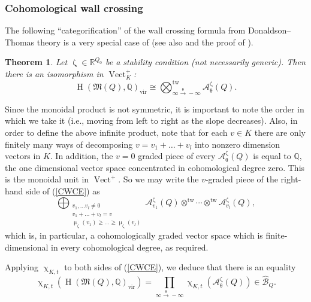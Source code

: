 \documentclass{amsart}
\DeclareMathOperator{\Vect}{Vect}
\DeclareMathOperator{\tw}{tw}
\newcommand{\Mst}{\mathfrak{M}}
\DeclareMathOperator{\HO}{H}
\DeclareMathOperator{\vir}{vir}
\renewcommand{\theta}{\uptheta}
\renewcommand{\zeta}{\upzeta}
\renewcommand{\chi}{\upchi}
\renewcommand{\mu}{\upmu}
\theoremstyle{plain}%
\newtheorem{thm}{Theorem}[section]
\theoremstyle{definition}
\theoremstyle{remark}
\begin{document}
\subsubsection{Cohomological wall crossing}
The following ``categorification'' of the wall crossing formula from Donaldson--Thomas theory is a very special case of \cite[Thm B]{DavMei} (see also \cite{FraRei} and the proof of \cite[Thm 3.21]{DavPos}).
\begin{thm}\label{coh_WCF_thm}
Let $\zeta\in\mathbb{R}^{Q_0}$ be a stability condition (not necessarily generic).  Then there is an isomorphism in $\Vect^+_{K}$:
\begin{equation}
\label{CWCE}
\HO(\Mst(Q),\mathbb{Q})_{\vir}\cong \bigotimes^{\tw}_{\infty \xrightarrow{\theta}-\infty}\mathcal{A}_{\theta}^{\zeta}(Q).
\end{equation}
\end{thm}
Since the monoidal product is not symmetric, it is important to note the order in which we take it (i.e., moving from left to right as the slope decreases).  Also, in order to define the above infinite product, note that for each $v\in K$ there are only finitely many ways of decomposing $v=v_1+\ldots +v_l$ into nonzero dimension vectors in $K$.  In addition, the $v=0$ graded piece of every $\mathcal{A}_{\theta}^{\zeta}(Q)$ is equal to $\mathbb{Q}$, the one dimensional vector space concentrated in cohomological degree zero.  This is the monoidal unit in $\Vect^+$.  So
we may write the $v$-graded piece of the right-hand side of (\ref{CWCE}) as
\[
\bigoplus_{\substack{v_1,\ldots v_l\neq 0\\v_1+\ldots+v_l=v\\ \mu_{\zeta}(v_1)\geq \ldots\geq \mu_{\zeta}(v_l)}}\mathcal{A}^{\zeta}_{v_1}(Q)\otimes^{\tw}\cdots\otimes^{\tw}\mathcal{A}^{\zeta}_{v_l}(Q),
\]
which is, in particular, a cohomologically graded vector space which is finite-dimensional in every cohomological degree, as required.

Applying $\chi_{K,t}$ to both sides of (\ref{CWCE}), we deduce that there is an equality
\begin{equation}
\label{WCF}
\chi_{K,t}\left(\HO(\Mst(Q),\mathbb{Q})_{\vir}\right)=\prod_{\infty\xrightarrow{\theta} -\infty}\chi_{K,t}(\mathcal{A}_{\theta}^{\zeta}(Q))\in\hat{\mathscr{B}}_Q.
\end{equation}
\end{document}
